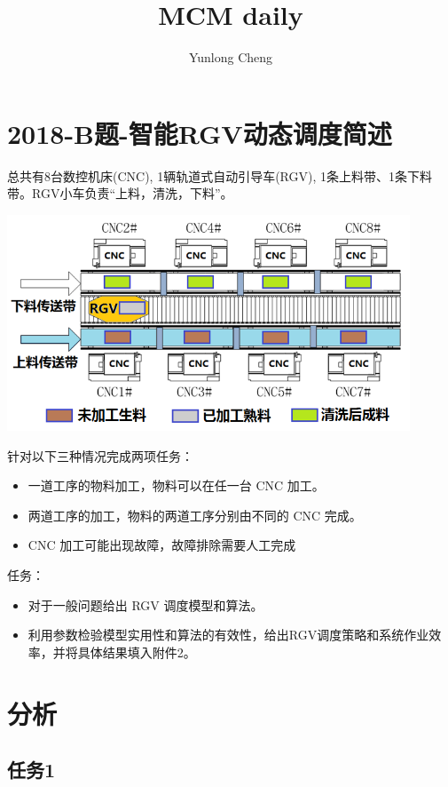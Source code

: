 \documentclass[12pt,a4paper]{article}
\title{MCM daily}
\author{Yunlong Cheng}
\begin{document}
\maketitle
\section{2018-B题-智能RGV动态调度简述}
总共有8台数控机床(CNC), 1辆轨道式自动引导车(RGV), 1条上料带、1条下料带。RGV小车负责“上料，清洗，下料”。

\begin{center}
  \includegraphics[width = 0.9\textwidth]{figures/illustrate-diagram.png}
\end{center}
针对以下三种情况完成两项任务：
\begin{itemize}
  \item 一道工序的物料加工，物料可以在任一台 CNC 加工。
  \item 两道工序的加工，物料的两道工序分别由不同的 CNC 完成。
  \item CNC 加工可能出现故障，故障排除需要人工完成
\end{itemize}
任务：
\begin{itemize}
  \item 对于一般问题给出 RGV 调度模型和算法。
  \item 利用参数检验模型实用性和算法的有效性，给出RGV调度策略和系统作业效率，并将具体结果填入附件2。
\end{itemize}

\section{分析}
\subsection{任务1}
\end{document}
